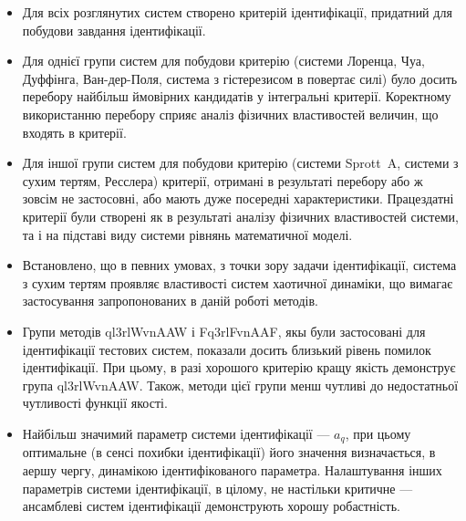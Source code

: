 \begin{itemize}

  \item
    Для всіх розглянутих систем створено критерій
    ідентифікації, придатний для побудови завдання ідентифікації.

  \item
    Для однієї групи систем для побудови критерію (системи Лоренца,
    Чуа, Дуффінга, Ван-дер-Поля, система з гістерезисом в повертає
    силі) було досить перебору найбільш ймовірних кандидатів у
    інтегральні критерії. Коректному використанню перебору сприяє
    аналіз фізичних властивостей величин, що входять в критерії.

  \item
    Для іншої групи систем для побудови критерію (системи Sprott~A,
    системи з сухим тертям, Ресслера) критерії, отримані в результаті
    перебору або ж зовсім не застосовні, або мають дуже посередні
    характеристики. Працездатні критерії були створені як в
    результаті аналізу фізичних властивостей системи, та і на
    підставі виду системи рівнянь математичної моделі.


  \item
    Встановлено, що в певних умовах, з точки зору задачи
    ідентифікації, система з сухим тертям проявляє властивості
    систем хаотичної динаміки, що вимагає застосування
    запропонованих в даній роботі методів.


  \item
    Групи методів ql3rlWvnAAW і Fq3rlFvnAAF, якы були застосовані для ідентифікації
    тестових систем, показали досить близький рівень помилок
    ідентифікації. При цьому, в разі хорошого критерію кращу якість
    демонструє група ql3rlWvnAAW. Також, методи цієї групи менш чутливі
    до недостатньої чутливості функції якості.

  \item
    Найбільш значимий параметр системи ідентифікації ---
    $a_q $, при цьому оптимальне (в сенсі похибки ідентифікації)
    його значення визначається, в аершу чергу, динамікою
    ідентифікованого параметра. Налаштування інших параметрів
    системи ідентифікації, в цілому, не настільки критичне ---
    ансамблеві систем ідентифікації демонструють хорошу робастність.


\end{itemize}



